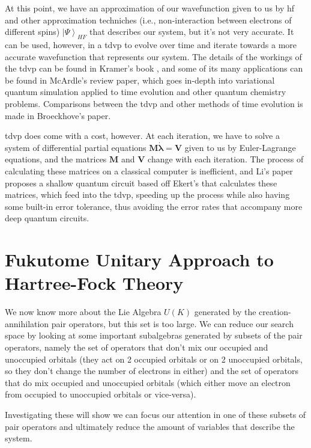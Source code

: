 \documentclass{aux/ttuthes2007}
\newcommand{\ket}[1]{\ensuremath{\left|#1\right\rangle}}
\newcommand{\orb}{K}
\begin{document}
	At this point, we have an approximation of our wavefunction given to us by \gls{hf} and other approximation techniches (i.e., non-interaction between electrons of different spins) $\ket\Psi_{HF}$ that describes our system, but it's not very accurate. It can be used, however, in a \gls{tdvp} to evolve over time and iterate towards a more accurate wavefunction that represents our system. The details of the workings of the \gls{tdvp} can be found in Kramer's book , and some of its many applications can be found in McArdle's  review paper, which goes in-depth into variational quantum simulation applied to time evolution and other quantum chemistry problems. Comparisons between the \gls{tdvp} and other methods of time evolution is made in Broeckhove's  paper.

	\gls{tdvp} does come with a cost, however. At each iteration, we have to solve a system of differential partial equations $\bm M \dot {\bm \lambda} = \bm V$ given to us by Euler-Lagrange equations, and the matrices $\bm M$ and $\bm V$ change with each iteration. The process of calculating these matrices on a classical computer is inefficient, and Li's paper  proposes a shallow quantum circuit based off Ekert's  that calculates these matrices, which feed into the \gls{tdvp}, speeding up the process while also having some built-in error tolerance, thus avoiding the error rates that accompany more deep quantum circuits.

\section {\textbf{Fukutome Unitary Approach to Hartree-Fock Theory}}

We now know more about the Lie Algebra $U(\orb)$ generated by the creation-annihilation pair operators, but this set is too large.
We can reduce our search space by looking at some important subalgebras generated by subsets of the pair operators, namely the set of operators that don't mix our occupied and unoccupied orbitals (they act on 2 occupied orbitals or on 2 unoccupied orbitals, so they don't change the number of electrons in either) and the set of operators that do mix occupied and unoccupied orbitals (which either move an electron from occupied to unoccupied orbitals or vice-versa).

Investigating these will show we can focus our attention in one of these subsets of pair operators and ultimately reduce the amount of variables that describe the system.
\end{document}

